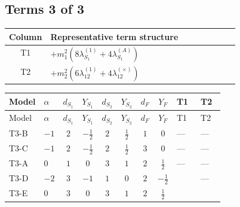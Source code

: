 \documentclass[8pt]{article}
\begin{document}
\begin{landscape}
\subsection*{Terms 3 of 3}
\begin{center}
\begin{tabular}{@{}c >{\raggedright\arraybackslash}p{0.82\linewidth}@{}}
\toprule
Column & Representative term structure \\
\midrule
T1 & \(\displaystyle +{m_1^2} (8 {\lambda_{S_1}^{(1)}}+4 {\lambda_{S_1}^{(A)}})\) \\
\midrule
T2 & \(\displaystyle +{m_2^2} (6 {\lambda_{12}^{(1)}}+4 {\lambda_{12}^{(\times)}})\) \\
\midrule
\bottomrule
\end{tabular}
\end{center}
\smallskip
\tiny
\begin{longtable}{@{}llcccccc >{\raggedright\arraybackslash}p{0.21\linewidth} >{\raggedright\arraybackslash}p{0.21\linewidth}@{}}
\toprule
Model & $\alpha$ & $d_{S_1}$ & $Y_{S_1}$ & $d_{S_2}$ & $Y_{S_2}$ & $d_F$ & $Y_F$ & T1 & T2 \\
\midrule
\endfirsthead
\toprule
Model & $\alpha$ & $d_{S_1}$ & $Y_{S_1}$ & $d_{S_2}$ & $Y_{S_2}$ & $d_F$ & $Y_F$ & T1 & T2 \\
\midrule
\endhead
T3-B & $-1$ & $2$ & $-\frac{1}{2}$ & $2$ & $\frac{1}{2}$ & $1$ & $0$ & --- & --- \\
\midrule
T3-C & $-1$ & $2$ & $-\frac{1}{2}$ & $2$ & $\frac{1}{2}$ & $3$ & $0$ & --- & --- \\
\midrule
T3-A & $0$ & $1$ & $0$ & $3$ & $1$ & $2$ & $\frac{1}{2}$ & --- & --- \\
\midrule
T3-D & $-2$ & $3$ & $-1$ & $1$ & $0$ & $2$ & $-\frac{1}{2}$ & \scriptsize\adjustbox{max width=\linewidth}{$\begin{gathered} +{m_1^2} (8 {\lambda_{S_1}^{(1)}}+4 {\lambda_{S_1}^{(A)}})\end{gathered}$} & --- \\
\midrule
T3-E & $0$ & $3$ & $0$ & $3$ & $1$ & $2$ & $\frac{1}{2}$ & \scriptsize\adjustbox{max width=\linewidth}{$\begin{gathered} +{m_1^2} (8 {\lambda_{S_1}^{(1)}}+4 {\lambda_{S_1}^{(A)}})\end{gathered}$} & \scriptsize\adjustbox{max width=\linewidth}{$\begin{gathered} +{m_2^2} (6 {\lambda_{12}^{(1)}}+4 {\lambda_{12}^{(\times)}})\end{gathered}$} \\
\midrule
\bottomrule
\end{longtable}
\clearpage

\end{landscape}
\end{document}
